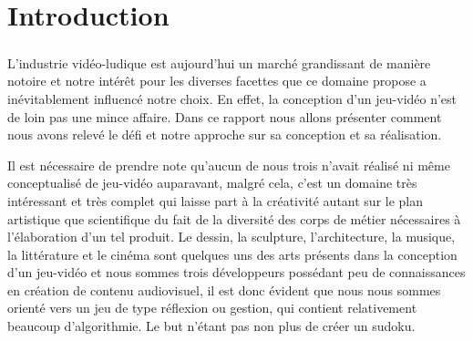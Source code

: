 \documentclass[a4paper,10pt,openany,oneside]{report}
\begin{document}
\chapter*{Introduction}
\setcounter{page}{1}
\paragraph{}
L'industrie vidéo-ludique est aujourd'hui un marché grandissant de manière notoire et notre intérêt pour les diverses facettes que ce domaine propose a inévitablement influencé notre choix.
En effet, la conception d'un jeu-vidéo n'est de loin pas une mince affaire. Dans ce rapport nous allons présenter comment nous avons relevé le défi et notre approche sur sa conception et sa réalisation.

Il est nécessaire de prendre note qu'aucun de nous trois n'avait réalisé ni même conceptualisé de jeu-vidéo auparavant, malgré cela, c'est un domaine très intéressant et très complet qui laisse part à la créativité autant sur le plan artistique que scientifique du fait de la diversité des corps de métier nécessaires à l'élaboration d'un tel produit. Le dessin, la sculpture, l'architecture, la musique, la littérature et le cinéma sont quelques uns des arts présents dans la conception d'un jeu-vidéo et nous sommes trois développeurs possédant peu de connaissances en création de contenu audiovisuel, il est donc évident que nous nous sommes orienté vers un jeu de type réflexion ou gestion, qui contient relativement beaucoup d'algorithmie. Le but n'étant pas non plus de créer un sudoku.
\end{document}

